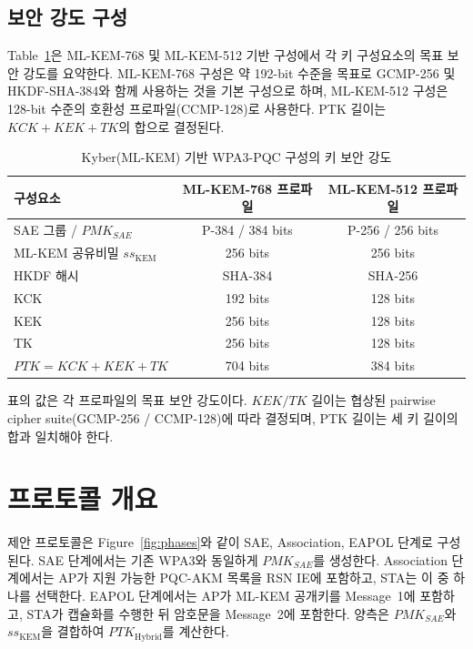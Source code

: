 \documentclass[11pt]{article}
\newcommand{\ssK}{\ensuremath{ss_{\mathrm{KEM}}}}
\newcommand{\pmkSAE}{\ensuremath{PMK_{SAE}}}
\newcommand{\ptkH}{\ensuremath{PTK_{\mathrm{Hybrid}}}}
\theoremstyle{definition}
\theoremstyle{plain}
\begin{document}
\subsection{보안 강도 구성}\label{sec:strength}
Table~\ref{tab:strength}은 ML-KEM-768 및 ML-KEM-512 기반 구성에서 각 키
구성요소의 목표 보안 강도를 요약한다. ML-KEM-768 구성은 약 192-bit 수준을
목표로 GCMP-256 및 HKDF-SHA-384와 함께 사용하는 것을 기본 구성으로 하며,
ML-KEM-512 구성은 128-bit 수준의 호환성 프로파일(CCMP-128)로 사용한다. PTK
길이는 $KCK\!+\!KEK\!+\!TK$의 합으로 결정된다.

\begin{table}[H]\centering
\caption{Kyber(ML-KEM) 기반 WPA3-PQC 구성의 키 보안 강도}\label{tab:strength}
\small
\begin{tabular}{@{}lcc@{}}
\toprule
구성요소 & ML-KEM-768 프로파일 & ML-KEM-512 프로파일 \\ \midrule
SAE 그룹 / $\pmkSAE$ & P-384 / 384 bits & P-256 / 256 bits \\
ML-KEM 공유비밀 \ssK & 256 bits & 256 bits \\
HKDF 해시 & SHA-384 & SHA-256 \\
KCK & 192 bits & 128 bits \\
KEK & 256 bits & 128 bits \\
TK & 256 bits & 128 bits \\
$PTK=KCK\!+\!KEK\!+\!TK$ & 704 bits & 384 bits \\ \bottomrule
\end{tabular}
\par\smallskip
\footnotesize 표의 값은 각 프로파일의 목표 보안 강도이다. $KEK/TK$ 길이는
협상된 pairwise cipher suite(GCMP-256 / CCMP-128)에 따라 결정되며, PTK 길이는
세 키 길이의 합과 일치해야 한다.
\end{table}

\section{프로토콜 개요}\label{sec:overview}
제안 프로토콜은 Figure~\ref{fig:phases}와 같이 SAE, Association, EAPOL 단계로
구성된다. SAE 단계에서는 기존 WPA3와 동일하게 \pmkSAE{}를 생성한다.
Association 단계에서는 AP가 지원 가능한 PQC-AKM 목록을 RSN IE에 포함하고,
STA는 이 중 하나를 선택한다. EAPOL 단계에서는 AP가 ML-KEM 공개키를
Message~1에 포함하고, STA가 캡슐화를 수행한 뒤 암호문을 Message~2에 포함한다.
양측은 \pmkSAE{}와 \ssK{}을 결합하여 \ptkH{}를 계산한다.
\end{document}
